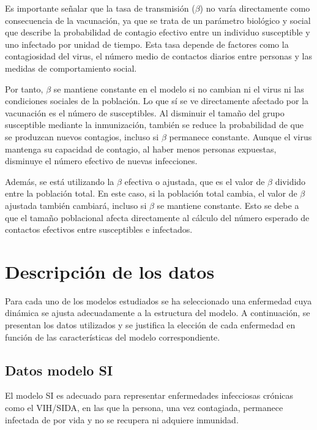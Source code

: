 Es importante señalar que la tasa de transmisión ($\beta$) no varía directamente como consecuencia de la vacunación, ya que se trata de un parámetro biológico y social que describe la probabilidad de contagio efectivo entre un individuo susceptible y uno infectado por unidad de tiempo. Esta tasa depende de factores como la contagiosidad del virus, el número medio de contactos diarios entre personas y las medidas de comportamiento social.

Por tanto, $\beta$ se mantiene constante en el modelo si no cambian ni el virus ni las condiciones sociales de la población. Lo que sí se ve directamente afectado por la vacunación es el número de susceptibles. Al disminuir el tamaño del grupo susceptible mediante la inmunización, también se reduce la probabilidad de que se produzcan nuevos contagios, incluso si $\beta$ permanece constante. Aunque el virus mantenga su capacidad de contagio, al haber menos personas expuestas, disminuye el número efectivo de nuevas infecciones.

Además, se está utilizando la $\beta$ efectiva o ajustada, que es el valor de $\beta$ dividido entre la población total. En este caso, si la población total cambia, el valor de $\beta$ ajustada también cambiará, incluso si $\beta$ se mantiene constante. Esto se debe a que el tamaño poblacional afecta directamente al cálculo del número esperado de contactos efectivos entre susceptibles e infectados.
















\section{Descripción de los datos}
Para cada uno de los modelos estudiados se ha seleccionado una enfermedad cuya dinámica se ajusta adecuadamente a la estructura del modelo. A continuación, se presentan los datos utilizados y se justifica la elección de cada enfermedad en función de las características del modelo correspondiente.

\subsection{Datos modelo SI}
El modelo SI es adecuado para representar enfermedades infecciosas crónicas como el VIH/SIDA, en las que la persona, una vez contagiada, permanece infectada de por vida y no se recupera ni adquiere inmunidad.

